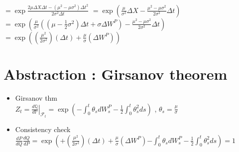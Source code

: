 \documentclass{article}
\begin{document}
\begin{description}
          $ = \exp \frac{2\mu \Delta X \Delta t - (\mu^2 - \mu\sigma^2)\Delta t^2}{2\sigma^2 \Delta t}$
          $ = \exp \left( \frac{\mu}{\sigma^2}\Delta X - \frac{\mu^2-\mu\sigma^2}{2\sigma^2}\Delta t \right)$\\
          $ = \exp \left( \frac{\mu}{\sigma^2} ( (\mu - \frac{1}{2} \sigma^2 )  \Delta t + \sigma  \Delta W^P  )  - \frac{\mu^2-\mu\sigma^2}{2\sigma^2}\Delta t \right)$\\
          $ = \exp \left( (\frac{\mu^2}{2\sigma^2} ) ( \Delta t )+ \frac{\mu}{\sigma}  (\Delta W^P ) \right)$
\end{description}

\section{Abstraction : Girsanov theorem}
\begin{itemize}
    \item Girsanov thm  \\
          $ Z_t = \left. \frac{d\mathbb{Q}}{d\mathbb{P}} \right|_{\mathcal{F}_t} = \exp\left( - \int_0^t \theta_s dW_s^P - \frac{1}{2} \int_0^t \theta_s^2 ds \right) $
          , $\theta_s = \frac{\mu}{\sigma}$
    \item Consistency check \\
          $\frac{dP}{dQ}  \frac{dQ}{dP} =  \exp \left( \mathbf{+}(\frac{\mu^2}{2\sigma^2} ) ( \Delta t )+ \frac{\mu}{\sigma} (\Delta W^P ) \mathbf{-} \int_0^t \theta_s dW_s^P - \frac{1}{2} \int_0^t \theta_s^2 ds \right) = 1 $
\end{itemize}
\end{document}
